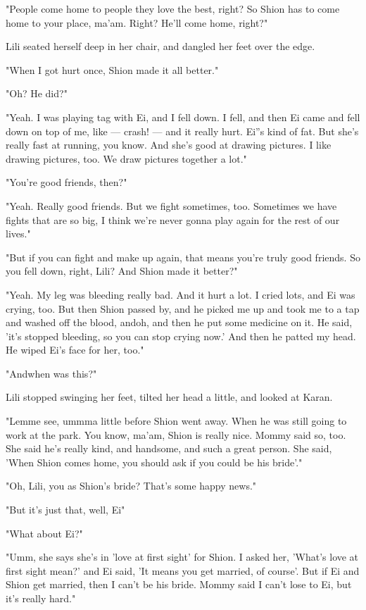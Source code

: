 "People come home to people they love the best, right? So Shion has to
come home to your place, ma'am. Right? He'll come home, right?"

Lili seated herself deep in her chair, and dangled her feet over the
edge.

"When I got hurt once, Shion made it all better."

"Oh? He did?"

"Yeah. I was playing tag with Ei, and I fell down. I fell, and then Ei
came and fell down on top of me, like --- crash! --- and it really hurt.
Ei''s kind of fat. But she's really fast at running, you know. And she's
good at drawing pictures. I like drawing pictures, too. We draw pictures
together a lot."

"You're good friends, then?"

"Yeah. Really good friends. But we fight sometimes, too. Sometimes we
have fights that are so big, I think we're never gonna play again for
the rest of our lives."

"But if you can fight and make up again, that means you're truly good
friends. So you fell down, right, Lili? And Shion made it better?"

"Yeah. My leg was bleeding really bad. And it hurt a lot. I cried lots,
and Ei was crying, too. But then Shion passed by, and he picked me up
and took me to a tap and washed off the blood, and\el oh, and then he
put some medicine on it. He said, 'it's stopped bleeding, so you can
stop crying now.' And then he patted my head. He wiped Ei's face for
her, too."

"And\el when was this?"

Lili stopped swinging her feet, tilted her head a little, and looked at
Karan.

"Lemme see, ummm\el a little before Shion went away. When he was still
going to work at the park. You know, ma'am, Shion is really nice. Mommy
said so, too. She said he's really kind, and handsome, and such a great
person. She said, 'When Shion comes home, you should ask if you could be
his bride'."

"Oh, Lili, you as Shion's bride? That's some happy news."

"But it's just that, well, Ei\el "

"What about Ei?"

"Umm, she says she's in 'love at first sight' for Shion. I asked her,
'What's love at first sight mean?' and Ei said, 'It means you get
married, of course'. But if Ei and Shion get married, then I can't be
his bride. Mommy said I can't lose to Ei, but it's really hard."

